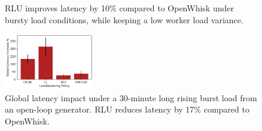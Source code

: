 \begin{figure}
  \caption{RLU improves latency by 10\% compared to OpenWhisk under bursty load conditions, while keeping a low worker load variance.}
  \label{fig:bursty-closedload}
\end{figure}




\begin{figure}
  \includegraphics[width=0.35\textwidth]{chrlu/faaslb-osdi22/figs/ow/openload/openload-latencies-cntnorm.pdf}
  \caption{Global latency impact under a 30-minute long rising burst load from an open-loop generator. RLU reduces  latency by 17\% compared to OpenWhisk.}
  \label{fig:bursty-openload}
\end{figure}

